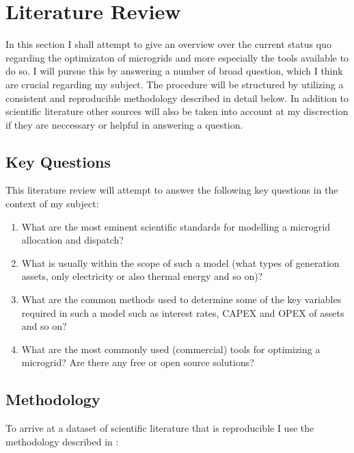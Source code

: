 \documentclass[
	11pt,								%
	DIV10,								%
	a4paper,         					%
	oneside,							%
	headheight=20pt,					%
	footheight=20pt,					%
    parskip=full,						%
    listof=totoc,						%
	bibliography=totoc,					%
	index=totoc,						%
]{scrartcl}
\begin{document}
\section{Literature Review}
In this section I shall attempt to give an overview over the current status quo regarding the optimizaton of microgrids and more especially the tools available to do so. I will pursue  this by answering a number of broad question, which I think are crucial regarding my subject. The procedure will be structured by utilizing a consistent and reproducible methodology described in detail below. In addition to scientific literature other sources will also be taken into account at my discrection if they are neccessary or helpful in answering a question.

\subsection{Key Questions}
This literature review will attempt to answer the following key questions in the context of my subject:
\begin{enumerate}
	\item What are the most eminent scientific standards for modelling a microgrid allocation and dispatch?
	\item What is usually within the scope of such a model (what types of generation assets, only electricity or also thermal energy and so on)? 
	\item What are the common methods used to determine some of the key variables required in such a model such as interest rates, CAPEX and OPEX of assets and so on?
	\item What are the most commonly used (commercial) tools for optimizing a microgrid? Are there any free or open source solutions? 
\end{enumerate} 

\subsection{Methodology}
To arrive at a dataset of scientific literature that is reproducible I use the methodology described in :
\end{document}
